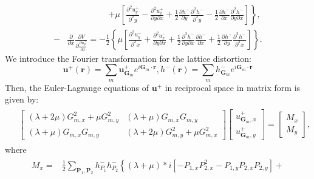 \documentclass[aps,prx,10pt,twocolumn,superscriptaddress]{revtex4}
\begin{document}
\begin{widetext}
\begin{equation}
\begin{split}
&\ \ \ \ \ \ \ \ \ \ \ \ \ \ \ \ \ \ \ \ \ \ \left.+\mu\left[\frac{\partial^{2}u^{+}_{y}}{\partial^{2}y}- \frac{\partial^{2}u^{+}_{x}}{\partial y\partial x}+\frac{1}{2}\frac{\partial h^{-}}{\partial y}\frac{\partial^{2}h^{-}}{\partial^{2}y}-\frac{1}{2}\frac{\partial h^{-}}{\partial x}\frac{\partial^{2}h^{-}}{\partial y\partial x}\right]\right\},\\
-&\frac{\partial }{\partial x}\frac{\partial V}{\partial \frac{\partial u^{+}_{y}}{\partial x}}=-\frac{1}{2}\left\{\mu\left[\frac{\partial^{2}u^{-}_{y}}{\partial^{2}x}+\frac{\partial^{2}u^{-}_{x}}{\partial y \partial x}+\frac{1}{2}\frac{\partial^{2}h^{-}}{\partial y\partial x}\frac{\partial h^{-}}{\partial x}+\frac{1}{2}\frac{\partial h^{-}}{\partial y}\frac{\partial^{2}h^{-}}{\partial^{2}x} \right]\right\}.
\end{split}
\end{equation}
We introduce the Fourier transformation for the lattice distortion:
\begin{equation}
\textbf{u}^{+}(\textbf{r})=\sum_{m}\textbf{u}^{+}_{\textbf{G}_{m}}e^{i\textbf{G}_{m}\cdot\textbf{r}}, h^{-}(\textbf{r})=\sum_{m}h^{-}_{\textbf{G}_{m}}e^{i\textbf{G}_{m}\cdot\textbf{r}}
\end{equation}
Then, the Euler-Lagrange equations of $\textbf{u}^{+}$ in reciprocal space in matrix form is given by: 
\begin{align}\label{eq:a24}
\begin{split}
&\left[\begin{array}{cc}
				(\lambda+2\mu)G^{2}_{m,x}+\mu G^{2}_{m,y} & (\lambda+\mu)G_{m,x}G_{m,y} \\
				(\lambda+\mu)G_{m,x}G_{m,y} & (\lambda+2\mu)G^{2}_{m,y}+\mu G^{2}_{m,x}
\end{array}\right]\left[\begin{array}{c}
                     u^{+}_{\textbf{G}_{m},x}\\
                     u^{+}_{\textbf{G}_{m},y}
\end{array}\right]=\left[\begin{array}{c}
                     M_{x}\\
                     M_{y}
\end{array}\right],
\end{split}
\end{align}
where
\begin{align}
\begin{split}
M_{x}=&\frac{1}{2}\sum_{\textbf{P}_{1},\textbf{P}_{2}}h^{-}_{P_{1}}h^{-}_{P_{2}}\left\{(\lambda+\mu)*i\left[-P_{1,x}P^{2}_{2,x}-P_{1,y}P_{2,x}P_{2,y}\right]\right.+\\

\end{split}
\end{align}
\end{widetext}
\end{document}
